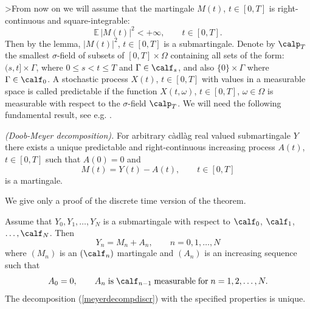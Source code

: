 \documentclass[preprint]{imsart}
\def\E{\mathbb E}
\begin{document}
{>From now on we will assume that the martingale
$M(t)$, $t\in [0,T]$ is right-continuous
and square-integrable:
$$
\E\, |M(t)|^2<+\infty,\qquad t\in [0,T].
$$
Then by the lemma,
$|M(t)|^2$, $t\in [0,T]$ is a submartingale.
Denote by $\calp_T$ the smallest $\sigma$-field of subsets of
$[0,T]\times \Omega$ containing all sets of the form:
$(s,t]\times \Gamma$, where $0\leq s<t\leq T$ and $\Gamma\in
\calf_s$, and also $\{0\}\times \Gamma$ where $\Gamma\in\calf_0$.
A stochastic process $X(t)$, $t\in [0,T]$ with values in a
measurable space is called predictable if the function
$X(t,\omega)$, $t\in [0,T]$, $\omega\in \Omega$ is measurable
with respect to the $\sigma$-field $\calp_T$. We will need the
following fundamental result, see e.g. \cite{rogers}.

\begin{Theorem}
{\em (Doob-Meyer decomposition).}
  For arbitrary c\`adl\`ag real valued submar\-tingale $Y$
  there exists a unique predictable and right-continuous
  increasing process $A(t)$, $t\in [0,T]$ such that $A(0)=0$ and
\begin{equation}\label{meyerdecomp}
  M(t)=Y(t)-A(t),
  \qquad t\in [0,T]
\end{equation}
is a martingale.
\end{Theorem}


\noindent We give only a proof of the discrete time version of the theorem.
\begin{Proposition}
  Assume that $Y_0,Y_1,\ldots,Y_N$ is a submartingale with respect
  to $\calf_0$, $\calf_1$, $\ldots,\calf_N$. Then
\begin{equation}\label{meyerdecompdiscr}
  Y_n=M_n+A_n,\qquad n=0,1,\ldots ,N
\end{equation}
where $(M_n)$ is an $(\calf_n)$ martingale and $(A_n)$ is an
increasing sequence such that
\begin{equation}\label{incprocdiscr}
  A_0=0,\qquad
  A_n {\rm \; is \;} \calf_{n-1} {\rm\; measurable
  \; for\;} n=1,2,\ldots, N.
\end{equation}
The decomposition (\ref{meyerdecompdiscr}) with the
specified properties is unique.
\end{Proposition}


}
\end{document}

